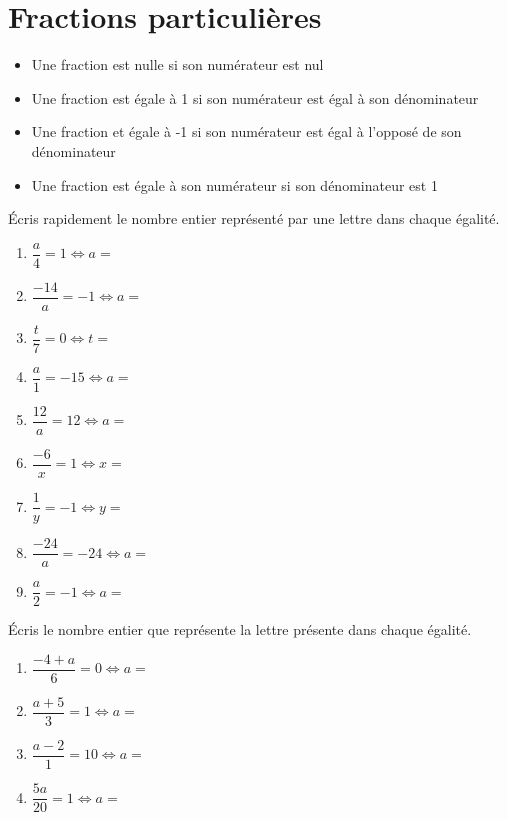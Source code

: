 \documentclass[../../syllabus_2.tex]{subfiles}
\begin{document}
\newpage
\section{Fractions particulières}
\begin{itemize}[itemsep=1.2cm, label=]
  \item Une fraction est nulle si son numérateur est nul \\ \exemples
  \item Une fraction est égale à 1 si son numérateur est égal à son dénominateur \\ \exemples
  \item Une fraction et égale à -1 si son numérateur est égal à l’opposé de son dénominateur \\ \exemples
  \item Une fraction est égale à son numérateur si son dénominateur est 1 \\ \exemples 
\end{itemize}
\vspace{1.5cm}


\begin{exercise}
  Écris rapidement le nombre entier représenté par une lettre dans chaque égalité.
  \begin{enumerate}[cols=3, itemsep=0.7cm]
    \item $\dfrac{a}{4}=1 \Leftrightarrow a = $
    \item $\dfrac{-14}{a}=-1 \Leftrightarrow a = $
    \item $\dfrac{t}{7}=0 \Leftrightarrow t= $
    \item $\dfrac{a}{1}=-15 \Leftrightarrow a= $
    \item $\dfrac{12}{a}=12 \Leftrightarrow a= $
    \item $\dfrac{-6}{x}=1 \Leftrightarrow x= $
    \item $\dfrac{1}{y}=-1 \Leftrightarrow y=$
    \item $\dfrac{-24}{a}=-24 \Leftrightarrow a= $
    \item $\dfrac{a}{2}=-1 \Leftrightarrow a=$
  \end{enumerate}
\end{exercise}

\begin{exercise}
  Écris le nombre entier que représente la lettre présente dans chaque égalité.
  \begin{enumerate}[cols=2, itemsep=0.7cm]
    \item $\dfrac{-4+a}{6}=0 \Leftrightarrow a =$
    \item $\dfrac{a+5}{3}=1 \Leftrightarrow a =$
    \item $\dfrac{a-2}{1}=10 \Leftrightarrow a =$
    \item $\dfrac{5a}{20}=1 \Leftrightarrow a =$
  \end{enumerate}
\end{exercise}
\end{document}
